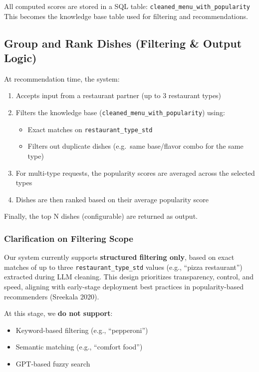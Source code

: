 \documentclass[
  11pt,
  a4paper,
  DIV=11,
  numbers=noendperiod]{scrartcl}
\providecommand{\tightlist}{%
  \setlength{\itemsep}{0pt}\setlength{\parskip}{0pt}}\usepackage{longtable,booktabs,array}
\begin{document}
All computed scores are stored in a SQL table:
\texttt{cleaned\_menu\_with\_popularity} This becomes the knowledge base
table used for filtering and recommendations.

\subsection{Group and Rank Dishes (Filtering \& Output
Logic)}\label{group-and-rank-dishes-filtering-output-logic}

At recommendation time, the system:

\begin{enumerate}
\def\labelenumi{\arabic{enumi}.}
\tightlist
\item
  Accepts input from a restaurant partner (up to 3 restaurant types)
\item
  Filters the knowledge base (\texttt{cleaned\_menu\_with\_popularity})
  using:

  \begin{itemize}
  \tightlist
  \item
    Exact matches on \texttt{restaurant\_type\_std}
  \item
    Filters out duplicate dishes (e.g.~same base/flavor combo for the
    same type)
  \end{itemize}
\item
  For multi-type requests, the popularity scores are averaged across the
  selected types
\item
  Dishes are then ranked based on their average popularity score
\end{enumerate}

Finally, the top N dishes (configurable) are returned as output.

\subsubsection{Clarification on Filtering
Scope}\label{clarification-on-filtering-scope}

Our system currently supports \textbf{structured filtering only}, based
on exact matches of up to three \texttt{restaurant\_type\_std} values
(e.g., ``pizza restaurant'') extracted during LLM cleaning. This design
prioritizes transparency, control, and speed, aligning with early-stage
deployment best practices in popularity-based recommenders (Sreekala
2020).

At this stage, we \textbf{do not support}:

\begin{itemize}
\tightlist
\item
  Keyword-based filtering (e.g., ``pepperoni'')
\item
  Semantic matching (e.g., ``comfort food'')
\item
  GPT-based fuzzy search
\end{itemize}
\end{document}
